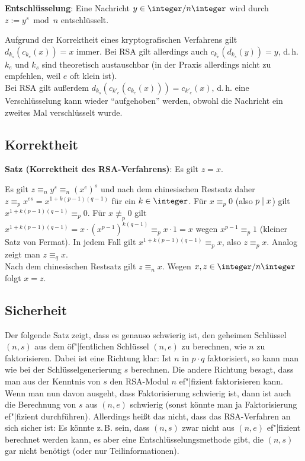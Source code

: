 \textbf{Entschlüsselung}:
Eine Nachricht $y \in \ZnZ$ wird durch $z := y^s \bmod n$ entschlüsselt.

Aufgrund der Korrektheit eines kryptografischen Verfahrens gilt $d_{k_s}(c_{k_e}(x)) = x$ immer.
Bei RSA gilt allerdings auch $c_{k_e}(d_{k_s}(y)) = y$, d.\,h.
$k_e$ und $k_s$ sind theoretisch austauschbar
(in der Praxis allerdings nicht zu empfehlen, weil $e$ oft klein ist).\\
Bei RSA gilt außerdem $d_{k_s}(c_{k'_e}(c_{k_e}(x))) = c_{k'_e}(x)$,
d.\,h. eine Verschlüsselung kann wieder "`aufgehoben"' werden, obwohl die Nachricht ein zweites
Mal verschlüsselt wurde.

\subsection{%
    Korrektheit%
}

\textbf{Satz (Korrektheit des RSA-Verfahrens)}:
Es gilt $z = x$.

\begin{Beweis}
    Es gilt $z \equiv_n y^s \equiv_n (x^e)^s$ und nach dem chinesischen Restsatz daher
    $z \equiv_p x^{es} = x^{1+k(p-1)(q-1)}$ für ein $k \in \integer$.
    Für $x \equiv_p 0$ (also $p \mid x$) gilt $x^{1+k(p-1)(q-1)} \equiv_p 0$.
    Für $x \not\equiv_p 0$ gilt
    $x^{1+k(p-1)(q-1)} = x \cdot (x^{p-1})^{k(q-1)} \equiv_p x \cdot 1 = x$
    wegen $x^{p-1} \equiv_p 1$ (kleiner Satz von Fermat).
    In jedem Fall gilt $x^{1+k(p-1)(q-1)} \equiv_p x$, also $z \equiv_p x$.
    Analog zeigt man $z \equiv_q x$.\\
    Nach dem chinesischen Restsatz gilt $z \equiv_n x$.
    Wegen $x, z \in \ZnZ$ folgt $x = z$.
\end{Beweis}

\pagebreak

\subsection{%
    Sicherheit%
}

Der folgende Satz zeigt, dass es genauso schwierig ist, den geheimen Schlüssel $(n, s)$
aus dem öf"|fentlichen Schlüssel $(n, e)$ zu berechnen, wie $n$ zu faktorisieren.
Dabei ist eine Richtung klar:
Ist $n$ in $p \cdot q$ faktorisiert, so kann man wie bei der Schlüsselgenerierung $s$ berechnen.
Die andere Richtung besagt, dass man aus der Kenntnis von $s$ den RSA-Modul $n$ ef"|fizient
faktorisieren kann.
Wenn man nun davon ausgeht, dass Faktorisierung schwierig ist, dann ist auch die Berechnung von $s$
aus $(n, e)$ schwierig (sonst könnte man ja Faktorisierung ef"|fizient durchführen).
Allerdings heißt das nicht, dass das RSA-Verfahren an sich sicher ist:
Es könnte z.\,B. sein, dass $(n, s)$ zwar nicht aus $(n, e)$ ef"|fizient berechnet werden kann,
es aber eine Entschlüsselungsmethode gibt, die $(n, s)$ gar nicht benötigt
(oder nur Teilinformationen).

